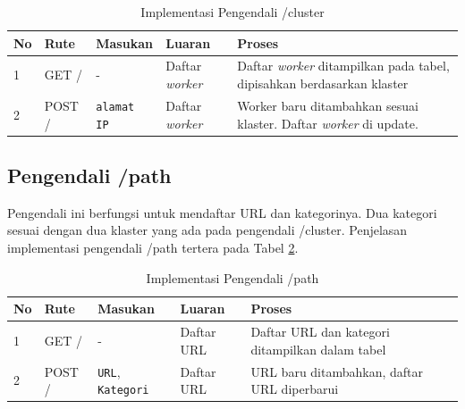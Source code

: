 \documentclass{ta-its}
\begin{document}
				\begin{longtable}{|p{}|p{}|p{}|p{}|p{}|} %
					
					\caption{Implementasi Pengendali /cluster} \label{tabelPengendaliCluster} \\
					\hline
					\textbf{No} & \textbf{Rute} & \textbf{Masukan} & \textbf{Luaran} & \textbf{Proses} \\ \hline
					
					\endhead
					\endfoot
					\endlastfoot
					
					1 & GET / & - & Daftar \textit{worker} &  Daftar \textit{worker} ditampilkan pada tabel, dipisahkan berdasarkan klaster\\ \hline
					2 & POST / & \texttt{alamat IP} & Daftar \textit{worker} & Worker baru ditambahkan sesuai klaster. Daftar \textit{worker} di update. \\ \hline				
					
				\end{longtable}
			
			\subsection{Pengendali /path}
				Pengendali ini berfungsi untuk mendaftar URL dan kategorinya. Dua kategori sesuai dengan dua klaster yang ada pada pengendali /cluster. Penjelasan implementasi pengendali /path tertera pada Tabel \ref{tabelPengendaliPath}.
				
				\begin{longtable}{|p{}|p{}|p{}|p{}|p{}|} %
					
					\caption{Implementasi Pengendali /path} \label{tabelPengendaliPath} \\
					\hline
					\textbf{No} & \textbf{Rute} & \textbf{Masukan} & \textbf{Luaran} & \textbf{Proses} \\ \hline
					
					\endhead
					\endfoot
					\endlastfoot
					
					1 & GET / & - & Daftar URL &  Daftar URL dan kategori ditampilkan dalam tabel \\ \hline
					2 & POST / & \texttt{URL}, \texttt{Kategori} & Daftar URL & URL baru ditambahkan, daftar URL diperbarui \\ \hline				
					
				\end{longtable}
	
\end{document}
